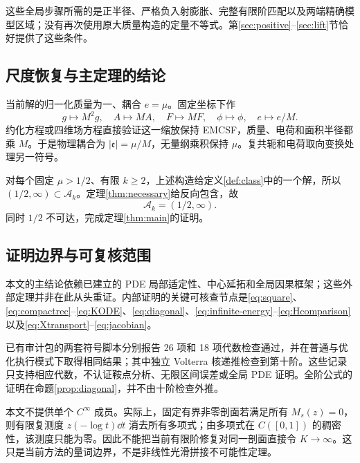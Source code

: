 这些全局步骤所需的是正半径、严格负入射膨胀、完整有限阶匹配以及两端精确模型区域；没有再次使用原大质量构造的定量不等式。第\ref{sec:positive}--\ref{sec:lift}节恰好提供了这些条件。

\subsection{尺度恢复与主定理的结论}
当前解的归一化质量为一、耦合 $e=\mu$。固定坐标下作
\begin{equation}\label{eq:scaling}
g\mapsto M^2g,\quad A\mapsto MA,\quad F\mapsto MF,
\quad\phi\mapsto\phi,\quad e\mapsto e/M.
\end{equation}
约化方程或四维场方程直接验证这一缩放保持 EMCSF，质量、电荷和面积半径都乘 $M$。于是物理耦合为 $|\mathfrak e|=\mu/M$，无量纲乘积保持 $\mu$。复共轭和电荷取向变换处理另一符号。

对每个固定 $\mu>1/2$、有限 $k\ge2$，上述构造给定义\ref{def:class}中的一个解，所以 $(1/2,\infty)\subset\mathscr A_k$。定理\ref{thm:necessary}给反向包含，故
\[
\boxed{\mathscr A_k=(1/2,\infty).}
\]
同时 $1/2$ 不可达，完成定理\ref{thm:main}的证明。

\subsection{证明边界与可复核范围}
本文的主结论依赖\cite{KU}已建立的 PDE 局部适定性、中心延拓和全局因果框架；这些外部定理并非在此从头重证。内部证明的关键可核查节点是\eqref{eq:square}、\eqref{eq:compactrec}--\eqref{eq:KODE}、\eqref{eq:diagonal}、\eqref{eq:infinite-energy}--\eqref{eq:Hcomparison}以及\eqref{eq:Xtransport}--\eqref{eq:jacobian}。

已有审计包的两套符号脚本分别报告 26 项和 18 项代数检查通过，并在普通与优化执行模式下取得相同结果；其中独立 Volterra 核递推检查到第十阶。这些记录只支持相应代数，不认证鞍点分析、无限区间误差或全局 PDE 证明。全阶公式的证明在命题\ref{prop:diagonal}，并不由十阶检查外推。

本文不提供单个 $C^\infty$ 成员。实际上，固定有界非零剖面若满足所有 $M_s(z)=0$，则有限复测度 $z(-\log t)\dd t$ 消去所有多项式；由多项式在 $C([0,1])$ 的稠密性，该测度只能为零。因此不能把当前有限阶修复对同一剖面直接令 $K\to\infty$。这只是当前方法的量词边界，不是非线性光滑拼接不可能性定理。
